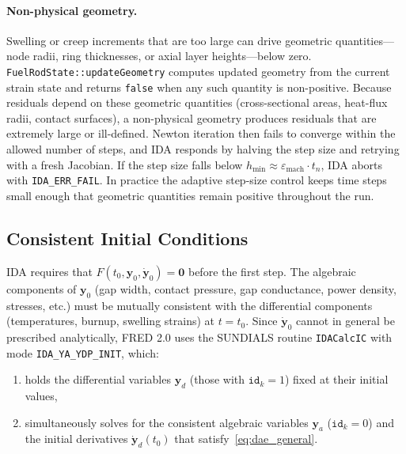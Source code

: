 \begin{refsection}
\paragraph{Non-physical geometry.} Swelling or creep increments that are too large can drive geometric quantities---node radii, ring thicknesses, or axial layer heights---below zero. \texttt{FuelRodState::\allowbreak{}updateGeometry} computes updated geometry from the current strain state and returns \texttt{false} when any such quantity is non-positive. Because residuals depend on these geometric quantities (cross-sectional areas, heat-flux radii, contact surfaces), a non-physical geometry produces residuals that are extremely large or ill-defined. Newton iteration then fails to converge within the allowed number of steps, and IDA responds by halving the step size and retrying with a fresh Jacobian. If the step size falls below $h_\mathrm{min} \approx \varepsilon_\mathrm{mach} \cdot t_n$, IDA aborts with \texttt{IDA\_ERR\_FAIL}. In practice the adaptive step-size control keeps time steps small enough that geometric quantities remain positive throughout the run.


\subsection{Consistent Initial Conditions}
\label{sec:calcic}

IDA requires that $F(t_0, \mathbf{y}_0, \dot{\mathbf{y}}_0) = \mathbf{0}$ before the first step.  The algebraic components of $\mathbf{y}_0$ (gap width, contact pressure, gap conductance, power density, stresses, etc.) must be mutually consistent with the differential components (temperatures, burnup, swelling strains) at $t = t_0$.  Since $\dot{\mathbf{y}}_0$ cannot in general be prescribed analytically, FRED 2.0 uses the SUNDIALS routine \texttt{IDACalcIC} with mode \texttt{IDA\_YA\_YDP\_INIT}, which:

\begin{enumerate}
\item holds the differential variables $\mathbf{y}_d$ (those with $\mathtt{id}_k = 1$) fixed at their initial values,
\item simultaneously solves for the consistent algebraic variables $\mathbf{y}_a$ ($\mathtt{id}_k = 0$) and the initial derivatives $\dot{\mathbf{y}}_d(t_0)$ that satisfy~\eqref{eq:dae_general}.
\end{enumerate}


\end{refsection}
